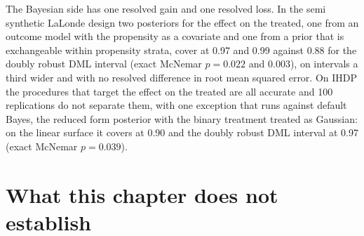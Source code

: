 The Bayesian side has one resolved gain and one resolved loss. In the semi synthetic LaLonde design two posteriors for the effect on the treated, one from an outcome model with the propensity as a covariate and one from a prior that is exchangeable within propensity strata, cover at 0.97 and 0.99 against 0.88 for the doubly robust DML interval (exact McNemar $p = 0.022$ and $0.003$), on intervals a third wider and with no resolved difference in root mean squared error. On IHDP the procedures that target the effect on the treated are all accurate and 100 replications do not separate them, with one exception that runs against default Bayes, the reduced form posterior with the binary treatment treated as Gaussian: on the linear surface it covers at 0.90 and the doubly robust DML interval at 0.97 (exact McNemar $p = 0.039$).

\section{What this chapter does not establish}\label{sec:crit:limits}

